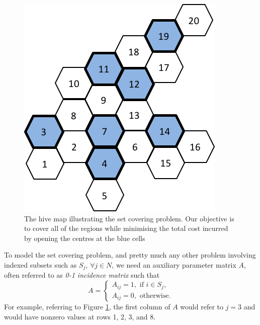 \begin{figure}[h]
	\centering
	\includegraphics[scale=0.8]{part_1/chapter_8/figures/hive_setcover.png}
	\caption{The hive map illustrating the set covering problem. Our objective is to cover all of the regions while minimising the total cost incurred by opening the centres at the blue cells} \label{p1c8:fig:set_covering}
\end{figure}

To model the set covering problem, and pretty much any other problem involving indexed subsets such as $S_j$, $\forall j \in N$, we need an auxiliary parameter matrix $A$, often referred to as \emph{0-1 incidence matrix} such that
%
\begin{equation*}
	A = \begin{cases}
		A_{ij} = 1, \text{ if } i \in S_j, \\
		A_{ij} = 0, \text{ otherwise.}
	\end{cases}
\end{equation*}
%
For example, referring to Figure \ref{p1c8:fig:set_covering}, the first column of $A$ would refer to $j = 3$ and would have nonzero values at rows 1, 2, 3, and 8.

